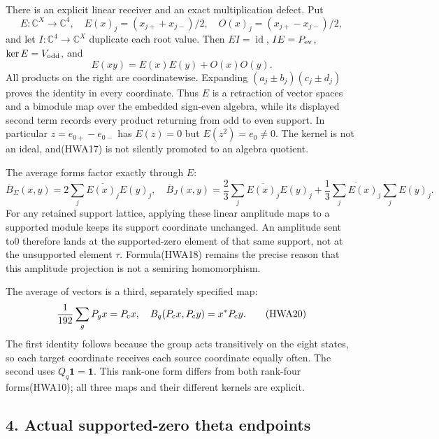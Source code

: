 \documentclass[
  10pt,
  a4paper,
]{article}
\begin{document}
There is an explicit linear receiver and an exact multiplication defect.
Put \[
E:\mathbb C^X\to\mathbb C^4,
\quad E(x)_j=(x_{j+}+x_{j-})/2,
\quad O(x)_j=(x_{j+}-x_{j-})/2,
\tag{HWA17}
\] and let \(I:\mathbb C^4\to\mathbb C^X\) duplicate each root value.
Then \(EI=\operatorname{id}\), \(IE=P_{\rm ev}\),
\(\ker E=V_{\rm odd}\), and \[
E(xy)=E(x)E(y)+O(x)O(y).
\tag{HWA18}
\] All products on the right are coordinatewise. Expanding
\((a_j\pm b_j)(c_j\pm d_j)\) proves the identity in every coordinate.
Thus \(E\) is a retraction of vector spaces and a bimodule map over the
embedded sign-even algebra, while its displayed second term records
every product returning from odd to even support. In particular
\(z=e_{0+}-e_{0-}\) has \(E(z)=0\) but \(E(z^2)=e_0\ne0\). The kernel is
not an ideal, and(HWA17) is not silently promoted to an algebra
quotient.

The average forms factor exactly through \(E\): \[
\overline B_\Sigma(x,y)=2\sum_j\overline{E(x)_j}E(y)_j,
\quad
\overline B_J(x,y)=\frac23\sum_j\overline{E(x)_j}E(y)_j
 +\frac13\overline{\sum_jE(x)_j}\sum_jE(y)_j.
\tag{HWA19}
\] For any retained support lattice, applying these linear amplitude
maps to a supported module keeps its support coordinate unchanged. An
amplitude sent to0 therefore lands at the supported-zero element of that
same support, not at the unsupported element \(\tau\). Formula(HWA18)
remains the precise reason that this amplitude projection is not a
semiring homomorphism.

The average of vectors is a third, separately specified map: \[
\frac1{192}\sum_gP_gx=P_{\rm c}x,
\quad B_q(P_{\rm c}x,P_{\rm c}y)=x^*P_{\rm c}y.
\tag{HWA20}
\] The first identity follows because the group acts transitively on the
eight states, so each target coordinate receives each source coordinate
equally often. The second uses \(Q_q\mathbf1=\mathbf1\). This rank-one
form differs from both rank-four forms(HWA10); all three maps and their
different kernels are explicit.

\subsection{4. Actual supported-zero theta
endpoints}\label{actual-supported-zero-theta-endpoints}
\end{document}
